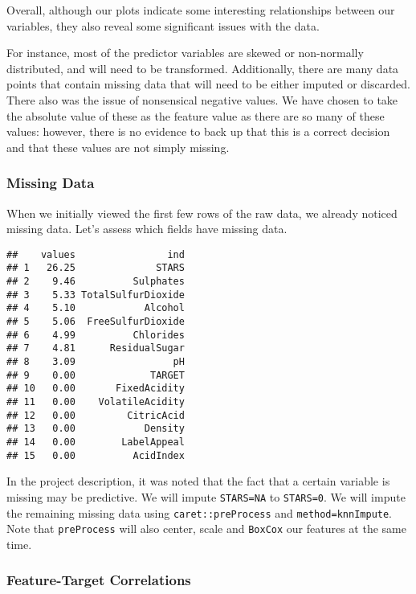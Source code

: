 \documentclass[
]{article}
\begin{document}
Overall, although our plots indicate some interesting relationships
between our variables, they also reveal some significant issues with the
data.

For instance, most of the predictor variables are skewed or non-normally
distributed, and will need to be transformed. Additionally, there are
many data points that contain missing data that will need to be either
imputed or discarded. There also was the issue of nonsensical negative
values. We have chosen to take the absolute value of these as the
feature value as there are so many of these values: however, there is no
evidence to back up that this is a correct decision and that these
values are not simply missing.

\hypertarget{missing-data}{%
\subsubsection{Missing Data}\label{missing-data}}

When we initially viewed the first few rows of the raw data, we already
noticed missing data. Let's assess which fields have missing data.

\begin{verbatim}
##    values                ind
## 1   26.25              STARS
## 2    9.46          Sulphates
## 3    5.33 TotalSulfurDioxide
## 4    5.10            Alcohol
## 5    5.06  FreeSulfurDioxide
## 6    4.99          Chlorides
## 7    4.81      ResidualSugar
## 8    3.09                 pH
## 9    0.00             TARGET
## 10   0.00       FixedAcidity
## 11   0.00    VolatileAcidity
## 12   0.00         CitricAcid
## 13   0.00            Density
## 14   0.00        LabelAppeal
## 15   0.00          AcidIndex
\end{verbatim}

In the project description, it was noted that the fact that a certain
variable is missing may be predictive. We will impute \texttt{STARS=NA}
to \texttt{STARS=0}. We will impute the remaining missing data using
\texttt{caret::preProcess} and \texttt{method=knnImpute}. Note that
\texttt{preProcess} will also center, scale and \texttt{BoxCox} our
features at the same time.

\hypertarget{feature-target-correlations}{%
\subsubsection{Feature-Target
Correlations}\label{feature-target-correlations}}
\end{document}
